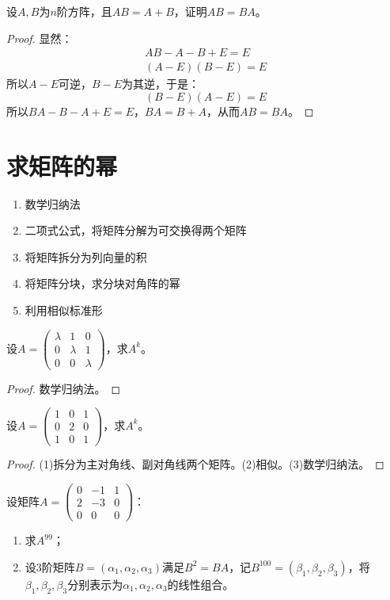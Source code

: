 \begin{theorem}
	设$A,B$为$n$阶方阵，且$AB=A+B$，证明$AB=BA$。
\end{theorem}
\begin{proof}
	显然：
	\begin{gather*}
		AB-A-B+E=E \\
		(A-E)(B-E)=E
	\end{gather*}
	所以$A-E$可逆，$B-E$为其逆，于是：
	\begin{equation*}
		(B-E)(A-E)=E
	\end{equation*}
	所以$BA-B-A+E=E$，$BA=B+A$，从而$AB=BA$。
\end{proof}

\section{求矩阵的幂}
\begin{enumerate}
	\item 数学归纳法
	\item 二项式公式，将矩阵分解为可交换得两个矩阵
	\item 将矩阵拆分为列向量的积
	\item 将矩阵分块，求分块对角阵的幂
	\item 利用相似标准形
\end{enumerate}
\begin{theorem}
	设$A=
	\begin{pmatrix}
		\lambda & 1 & 0 \\
		0 & \lambda & 1 \\
		0 & 0 & \lambda
	\end{pmatrix}$，求$A^k$。
\end{theorem}
\begin{proof}
	数学归纳法。
\end{proof}
\begin{theorem}
	设$A=
	\begin{pmatrix}
		1 & 0 & 1\\
		0 & 2 & 0 \\
		1 & 0 & 1
	\end{pmatrix}$，求$A^k$。
\end{theorem}
\begin{proof}
	(1)拆分为主对角线、副对角线两个矩阵。(2)相似。(3)数学归纳法。
\end{proof}
\begin{theorem}
	设矩阵$A=
	\begin{pmatrix}
		0 & -1 & 1 \\
		2 & -3 & 0 \\
		0 & 0 & 0 
	\end{pmatrix}$：
	\begin{enumerate}
		\item 求$A^{99}$；
		\item 设$3$阶矩阵$B=(\alpha_1,\alpha_2,\alpha_3)$满足$B^2=BA$，记$B^{100}=(\beta_1,\beta_2,\beta_3)$，将$\beta_1,\beta_2,\beta_3$分别表示为$\alpha_1,\alpha_2,\alpha_3$的线性组合。
	\end{enumerate}
\end{theorem}
